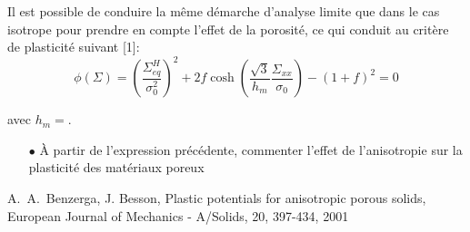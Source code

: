 \documentclass[french,english,12pt]{exam}
\begin{document}
\noindent
Il est possible de conduire la même démarche d'analyse limite que dans le cas isotrope pour prendre en compte l'effet de la porosité, ce qui conduit au critère de plasticité suivant [1]:
  \begin{equation}
   \phi\left( \Sigma     \right)  = \left(  \frac{\Sigma_{eq}^H}{\sigma_0^2} \right)^2 + 2f \cosh{\left(  \frac{\sqrt{3}}{h_m} \frac{\Sigma_{xx}}{\sigma_0} \right)} - (1 + f)^2 = 0
\label{eq5}
  \end{equation} 

  \noindent
  avec $h_m = $.\\

  \begin{itemize}
    \item[$\bullet$] \`A partir de l'expression précédente, commenter l'effet de l'anisotropie sur la plasticité des matériaux poreux\\
  \end{itemize}

  \noindent
  [1] A.~A.~Benzerga, J. Besson, Plastic potentials for anisotropic porous solids, European Journal of Mechanics - A/Solids, 20, 397-434, 2001
  
\end{document}
